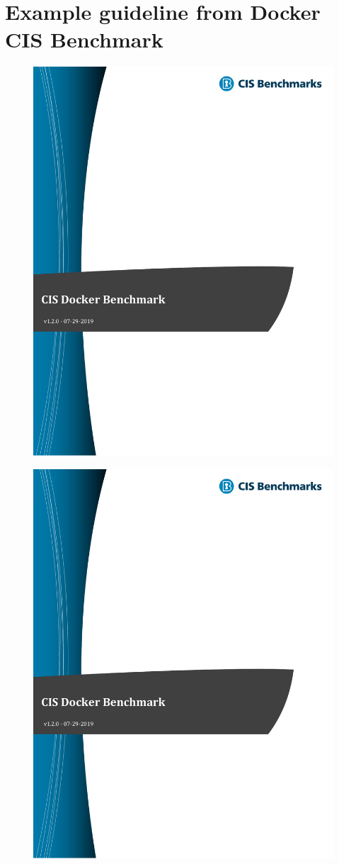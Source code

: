 \chapter{Example guideline from Docker CIS Benchmark}\label{appendix:a}

\begin{figure}[ht]
    \centering
    \includegraphics[page=135,width=.8\textwidth]{resources/images/cis_docker_benchmarks.pdf}
\end{figure}

\pagebreak

\begin{figure}[ht]
    \centering
    \includegraphics[page=136,width=.8\textwidth]{resources/images/cis_docker_benchmarks.pdf}
\end{figure}

